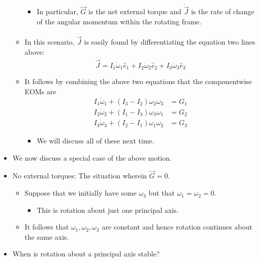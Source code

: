\documentclass[../notes.tex]{subfiles}
\begin{document}
\begin{itemize}
\begin{itemize}
\begin{equation*}
        \end{equation*}
        \begin{itemize}
            \item In particular, $\vec{G}$ is the net external torque and $\dot{\vec{J}}$ is the rate of change of the angular momentum within the rotating frame.
        \end{itemize}
        \item In this scenario, $\dot{\vec{J}}$ is easily found by differentiating the equation two lines above:
        \begin{equation*}
            \dot{\vec{J}} = I_1\dot{\omega}_1\hat{e}_1+I_2\dot{\omega}_2\hat{e}_2+I_3\dot{\omega}_3\hat{e}_3
        \end{equation*}
        \item It follows by combining the above two equations that the componentwise EOMs are
        \begin{align*}
            I_1\dot{\omega}_1+(I_3-I_2)\omega_2\omega_3 &= G_1\\
            I_2\dot{\omega}_2+(I_1-I_3)\omega_3\omega_1 &= G_2\\
            I_3\dot{\omega}_3+(I_2-I_1)\omega_1\omega_2 &= G_3
        \end{align*}
        \begin{itemize}
            \item We will discuss all of these next time.
        \end{itemize}
    \end{itemize}
    \item We now discuss a special case of the above motion.
    \item No external torques: The situation wherein $\vec{G}=0$.
    \begin{itemize}
        \item Suppose that we initially have some $\omega_3$ but that $\omega_1=\omega_2=0$.
        \begin{itemize}
            \item This is rotation about just one principal axis.
        \end{itemize}
        \item It follows that $\omega_1,\omega_2,\omega_3$ are constant and hence rotation continues about the same axis.
    \end{itemize}
    \item When is rotation about a principal axis stable?
    \begin{itemize}

\end{itemize}
\end{itemize}
\end{document}
